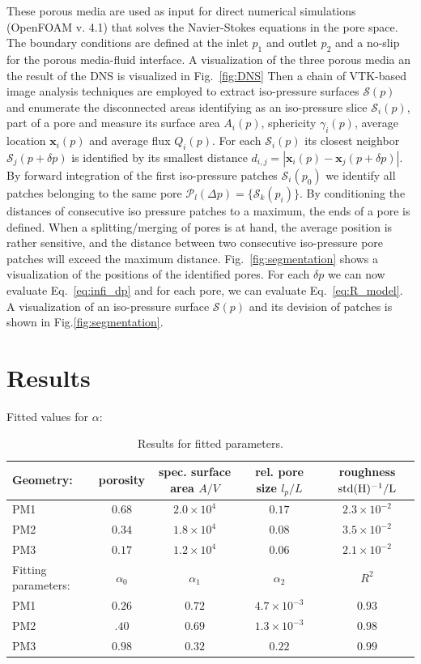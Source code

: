 \documentclass[draft]{agujournal2019}
\begin{document}
These porous media are used as input for direct numerical simulations (OpenFOAM v. 4.1)   that solves the Navier-Stokes equations in the pore space. The boundary conditions are defined at the inlet $p_1$ and outlet $p_2$ and a no-slip for the porous media-fluid interface. A visualization of the three porous media an the result of the DNS is visualized in Fig.~\ref{fig:DNS}
Then a chain of VTK-based image analysis techniques  are employed to extract iso-pressure surfaces $\mathcal{S}(p)$ and enumerate the disconnected areas identifying as an iso-pressure slice $\mathcal{S}_i(p)$, part of a pore and measure its surface area $A_i(p)$, sphericity $\gamma_i(p)$, average location $\mathbf{x}_i(p)$ and average flux $Q_i(p)$. For each $\mathcal{S}_i(p)$ its closest neighbor $\mathcal{S}_j(p+\delta p)$ is identified by its smallest distance $d_{i,j}= \left|  \mathbf{x}_i(p)-\mathbf{x}_j(p+\delta p)\right|$. By forward integration of the first iso-pressure patches $\mathcal{S}_i(p_0)$ we identify all patches belonging to the same pore $\mathcal{P}_l(\Delta p) = \{\mathcal{S}_k(p_i)\}$. By conditioning the distances of consecutive iso pressure patches to a maximum, the ends of a pore is defined. When a splitting/merging of pores is at hand, the average position is rather sensitive, and the distance between two consecutive iso-pressure pore patches will exceed the maximum distance. Fig.~\ref{fig:segmentation} shows a visualization of the positions of the identified pores. For each $\delta p$ we can now evaluate Eq.~\ref{eq:infi_dp} and for each pore, we can evaluate Eq.~\ref{eq:R_model}. A visualization of an iso-pressure surface $\mathcal{S}(p)$ and its devision of patches is shown in Fig.\ref{fig:segmentation}. 



\section{Results} 
Fitted values for $\alpha $:

\begin{table}[htbp!]
\centering
\begin{tabular}{l|c|c|c|c}
Geometry: & porosity & spec. surface area $A/V$ &rel. pore size $ l_p/L$ & roughness $\rm{std}(H)^{-1}/L$ \\
\hline
PM1 & $0.68$ & $2.0\times10^{4}$ & $0.17$ &  $2.3\times10^{-2}$\\
PM2 & $0.34$ & $1.8\times10^{4}$ & $0.08$ &  $3.5\times10^{-2}$\\
PM3 & $0.17$ & $1.2\times10^{4}$ & $0.06$ &  $2.1\times10^{-2}$\\
\hline
Fitting parameters: & $\alpha_0$ & $\alpha_1$ & $\alpha_2$ & $R^2$  \\
\hline
PM1 & $0.26$ & $0.72$ & $4.7\times 10^{-3}$ &  $0.93$\\
PM2 & $.40$ & $0.69$ & $1.3 \times 10^{-3}$ & $0.98$ \\
PM3 & $0.98$ & $0.32$ & $0.22$ & $0.99$ \\
\end{tabular}
\caption{\label{tab:table-name}Results for fitted parameters.}
\end{table}
\end{document}
